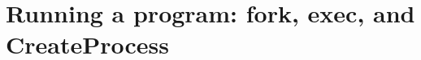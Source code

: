 \chapter{Running a program: fork, exec, and CreateProcess}
\label{ch:running-a-program-fork-exec-and}

